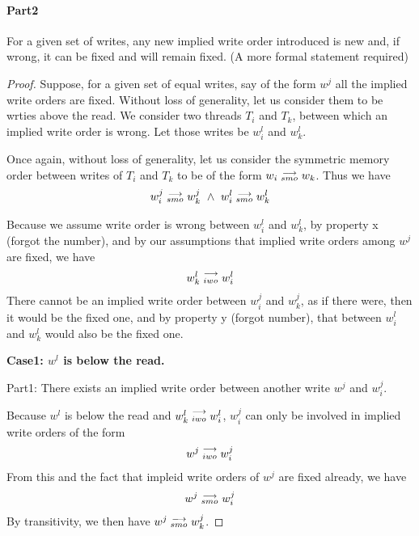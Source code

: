         \paragraph{Part2}
        For a given set of writes, any new implied write order introduced is new and, if wrong, it can be fixed and will remain fixed. 
        (A more formal statement required)
        \begin{proof}
            Suppose, for a given set of equal writes, say of the form $w^j$ all the implied write orders are fixed. Without loss of generality, let us consider them to be wrties above the read. We consider two threads $T_i$ and $T_k$, between which an implied write order is wrong. Let those writes be $w_i^l$ and $w_k^l$. 

            Once again, without loss of generality, let us consider the symmetric memory order between writes of $T_i$ and $T_k$ to be of the form $w_i\stackrel{\longrightarrow}{_{smo}}w_k$. Thus we have 
            \begin{align}
                \reln{w_i^j}{smo}{w_k^j} \ \wedge \ \reln{w_i^l}{smo}{w_k^l}
            \end{align}

            Because we assume write order is wrong between $w_i^l$ and $w_k^l$, by property x (forgot the number), and by our assumptions that implied write orders among $w^j$ are fixed, we have 
            \begin{align}
                w_k^l\stackrel{\longrightarrow}{_{iwo}}w_i^l
            \end{align} 
            There cannot be an implied write order between $w_i^j$ and $w_k^j$, as if there were, then it would be the fixed one, and by property y (forgot number), that between $w_i^l$ and $w_k^l$ would also be the fixed one. 

            \textbf{Case1: $w^l$ is below the read.}
            
                Part1: There exists an implied write order between another write $w^j$ and $w_i^j$. 

                    Because $w^l$ is below the read and $w_k^l\stackrel{\longrightarrow}{_{iwo}}w_i^l$, $w_i^j$ can only be involved in implied write orders of the form 
                    \begin{align}
                        w^j\stackrel{\longrightarrow}{_{iwo}}w_i^j
                    \end{align}
                    From this and the fact that impleid write orders of $w^j$ are fixed already, we have
                    \begin{align}
                        w^j\stackrel{\longrightarrow}{_{smo}}w_i^j 
                    \end{align} 
                    By transitivity, we then have $w^j\stackrel{\longrightarrow}{_{smo}}w_k^j$.


\end{proof}

